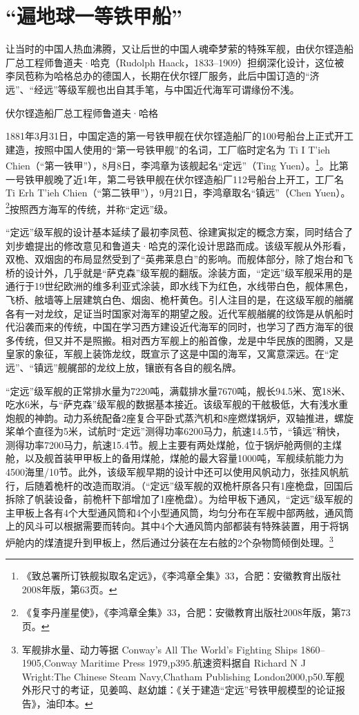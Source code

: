 \documentclass[12pt,UTF8]{ctexbook}
\begin{document}
\section{“遍地球一等铁甲船”}

让当时的中国人热血沸腾，又让后世的中国人魂牵梦萦的特殊军舰，由伏尔铿造船厂总工程师鲁道夫·哈克（Rudolph Haack，1833--1909）担纲深化设计，这位被李凤苞称为哈格总办的德国人，长期在伏尔铿厂服务，此后中国订造的“济远”、“经远”等级军舰也出自其手笔，与中国近代海军可谓缘份不浅。

伏尔铿造船厂总工程师鲁道夫·哈格

1881年3月31日，中国定造的第一号铁甲舰在伏尔铿造船厂的100号船台上正式开工建造，按照中国人使用的“第一号铁甲舰”的名词，工厂临时定名为 Ti I T’ieh Chien（“第一铁甲”），8月8日，李鸿章为该舰起名“定远”（Ting Yuen）。\footnote{《致总署所订铁舰拟取名定远》，《李鸿章全集》33，合肥：安徽教育出版社2008年版，第63页。}。比第一号铁甲舰晚了近1年，第二号铁甲舰在伏尔铿造船厂112号船台上开工，工厂名 Ti Erh T’ieh Chien（“第二铁甲”），9月21日，李鸿章取名“镇远”（Chen Yuen）。\footnote{《复李丹崖星使》，《李鸿章全集》33，合肥：安徽教育出版社2008年版，第73页。}按照西方海军的传统，并称“定远”级。

“定远”级军舰的设计基本延续了最初李凤苞、徐建寅拟定的概念方案，同时结合了刘步蟾提出的修改意见和鲁道夫·哈克的深化设计思路而成。该级军舰从外形看，双桅、双烟囱的布局显然受到了“英弗莱息白”的影响。而舰体部分，除了炮台和飞桥的设计外，几乎就是“萨克森”级军舰的翻版。涂装方面，“定远”级军舰采用的是通行于19世纪欧洲的维多利亚式涂装，即水线下为红色，水线带白色，舰体黑色，飞桥、舷墙等上层建筑白色、烟囱、桅杆黄色。引人注目的是，在这级军舰的艏艉各有一对龙纹，足证当时国家对海军的期望之殷。近代军舰艏艉的纹饰是从帆船时代沿袭而来的传统，中国在学习西方建设近代海军的同时，也学习了西方海军的很多传统，但又并不是照搬。相对西方军舰上的船首像，龙是中华民族的图腾，又是皇家的象征，军舰上装饰龙纹，既宣示了这是中国的海军，又寓意深远。在“定远”、“镇远”舰艉部的龙纹上放，镶嵌有各自的舰名牌。

“定远”级军舰的正常排水量为7220吨，满载排水量7670吨，舰长94.5米、宽18米、吃水6米，与“萨克森”级军舰的数据基本接近。该级军舰的干舷极低，大有浅水重炮舰的神韵。动力系统配备2座复合平卧式蒸汽机和8座燃煤锅炉，双轴推进，螺旋桨单个直径为5米，试航时“定远”测得功率6200马力，航速14.5节，“镇远”稍快，测得功率7200马力，航速15.4节。舰上主要有两处煤舱，位于锅炉舱两侧的主煤舱，以及舰首装甲甲板上的备用煤舱，煤舱的最大容量1000吨，军舰续航能力为4500海里/10节。此外，该级军舰早期的设计中还可以使用风帆动力，张挂风帆航行，后随着桅杆的改造而取消。（“定远”级军舰的双桅杆原各只有1座桅盘，回国后拆除了帆装设备，前桅杆下部增加了1座桅盘）。为给甲板下通风，“定远”级军舰的主甲板上各有4个大型通风筒和4个小型通风筒，均匀分布在军舰中部两舷，通风筒上的风斗可以根据需要而转向。其中4个大通风筒内部都装有特殊装置，用于将锅炉舱内的煤渣提升到甲板上，然后通过分装在左右舷的2个杂物筒倾倒处理。\footnote{军舰排水量、动力等据 Conway's All The World's Fighting Ships 1860--1905,Conway Maritime Press 1979,p395.航速资料据自 Richard N J Wright:The Chinese Steam Navy,Chatham Publishing London2000,p50.军舰外形尺寸的考证，见姜鸣、赵幼雄：《关于建造“定远”号铁甲舰模型的论证报告》，油印本。}
\end{document}
